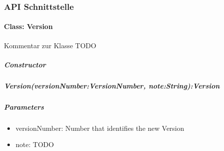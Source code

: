 \subsubsection{API Schnittstelle}
\paragraph{Class: Version}
Kommentar zur Klasse TODO
\subparagraph{Constructor}

\subparagraph{Version(versionNumber:VersionNumber, note:String):Version}

\subparagraph{Parameters}
\begin{itemize}
	\item{versionNumber:}
	Number that identifies the new Version
	\item{note:}
	TODO
\end{itemize}